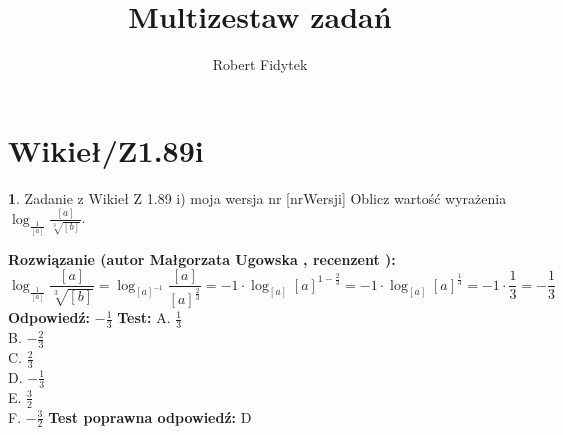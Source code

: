 \documentclass[12pt, a4paper]{article}
\title{Multizestaw zadań}
\author{Robert Fidytek}
\date{}
\theoremstyle{definition} %
\newtheorem{zad}{}
\newcommand{\kategoria}[1]{\section{#1}} %
\newcommand{\zadStart}[1]{\begin{zad}#1\newline} %
\newcommand{\zadStop}{\end{zad}}   %
\newcommand{\rozwStart}[2]{\noindent \textbf{Rozwiązanie (autor #1 , recenzent #2): }\newline} %
\newcommand{\rozwStop}{\newline}                                            %
\newcommand{\odpStart}{\noindent \textbf{Odpowiedź:}\newline}    %
\newcommand{\odpStop}{\newline}                                             %
\newcommand{\testStart}{\noindent \textbf{Test:}\newline} %
\newcommand{\testStop}{\newline} %
\newcommand{\kluczStart}{\noindent \textbf{Test poprawna odpowiedź:}\newline} %
\newcommand{\kluczStop}{\newline} %
\begin{document}
\maketitle


\kategoria{Wikieł/Z1.89i}
\zadStart{Zadanie z Wikieł Z 1.89 i) moja wersja nr [nrWersji]}
Oblicz warto\'sć wyrażenia $\log_{\frac{1}{[a]}}{\frac{[a]}{\sqrt[3]{[b]}}}$.
\zadStop
\rozwStart{Małgorzata Ugowska}{}
$$\log_{\frac{1}{[a]}}{\frac{[a]}{\sqrt[3]{[b]}}} =\log_{[a]^{-1}}{\frac{[a]}{[a]^{\frac{2}{3}}}}=-1 \cdot \log_{[a]}{[a]^{1-\frac{2}{3}}}=-1 \cdot \log_{[a]}{[a]^{\frac{1}{3}}} = -1 \cdot \frac{1}{3} = - \frac{1}{3}$$
\rozwStop
\odpStart
$-\frac{1}{3}$
\odpStop
\testStart
A. $\frac{1}{3}$\\
B. $-\frac{2}{3}$\\
C. $\frac{2}{3}$\\
D. $-\frac{1}{3}$\\
E. $\frac{3}{2}$\\
F. $-\frac{3}{2}$
\testStop
\kluczStart
D
\kluczStop
\end{document}
